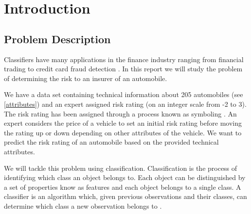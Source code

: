 \chapter{Introduction}

\section{Problem Description}
Classifiers have many applications in the finance industry ranging from financial trading \cite{Gerlein16} to credit card fraud detection \cite{Pozzolo15}.
In this report we will study the problem of determining the risk to an insurer of an automobile.

We have a data set containing technical information about 205 automobiles (see \cref{attributes}) and an expert assigned risk rating (on an integer scale from -2 to 3).
The risk rating has been assigned through a process known as symboling \cite{Automobile}.
An expert considers the price of a vehicle to set an initial risk rating before moving the rating up or down depending on other attributes of the vehicle.
We want to predict the risk rating of an automobile based on the provided technical attributes.

We will tackle this problem using classification.
Classification is the process of identifying which class an object belongs to.
Each object can be distinguished by a set of properties know as features and each object belongs to a single class.
A classifier is an algorithm which, given previous observations and their classes, can determine which class a new observation belongs to \cite{Theodoridis03}.

